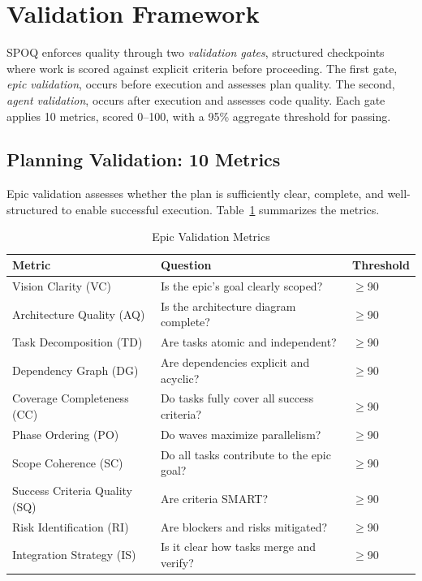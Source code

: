 \section{Validation Framework}
\label{sec:validation}

SPOQ enforces quality through two \textit{validation gates}, structured
checkpoints where work is scored against explicit criteria before proceeding.
The first gate, \textit{epic validation}, occurs before execution and assesses
plan quality. The second, \textit{agent validation}, occurs after execution
and assesses code quality. Each gate applies 10 metrics, scored 0--100, with
a 95\% aggregate threshold for passing.

\subsection{Planning Validation: 10 Metrics}
\label{subsec:planning-validation}

Epic validation assesses whether the plan is sufficiently clear, complete,
and well-structured to enable successful execution. Table~\ref{tab:planning-metrics}
summarizes the metrics.

\begin{table}[htbp]
\centering
\caption{Epic Validation Metrics}
\label{tab:planning-metrics}
\small
\begin{tabular}{lp{6cm}l}
\toprule
\textbf{Metric} & \textbf{Question} & \textbf{Threshold} \\
\midrule
Vision Clarity (VC) & Is the epic's goal clearly scoped? & $\geq$90 \\
Architecture Quality (AQ) & Is the architecture diagram complete? & $\geq$90 \\
Task Decomposition (TD) & Are tasks atomic and independent? & $\geq$90 \\
Dependency Graph (DG) & Are dependencies explicit and acyclic? & $\geq$90 \\
Coverage Completeness (CC) & Do tasks fully cover all success criteria? & $\geq$90 \\
Phase Ordering (PO) & Do waves maximize parallelism? & $\geq$90 \\
Scope Coherence (SC) & Do all tasks contribute to the epic goal? & $\geq$90 \\
Success Criteria Quality (SQ) & Are criteria SMART? & $\geq$90 \\
Risk Identification (RI) & Are blockers and risks mitigated? & $\geq$90 \\
Integration Strategy (IS) & Is it clear how tasks merge and verify? & $\geq$90 \\
\bottomrule
\end{tabular}
\end{table}

